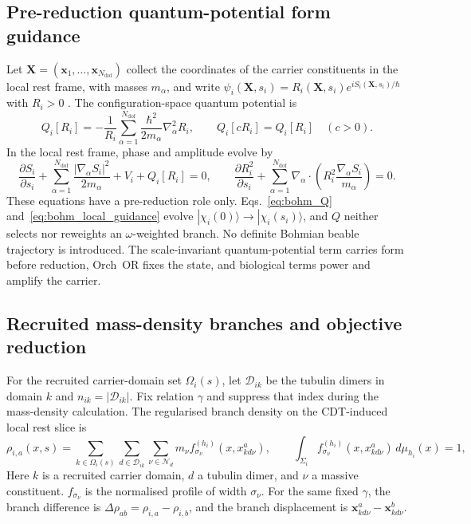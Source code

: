 \subsection{Pre-reduction quantum-potential form guidance}

Let $\mathbf X=(\mathbf x_1,\ldots,\mathbf x_{N_{\mathrm{dof}}})$ collect the coordinates of the
carrier constituents in the local rest frame, with masses $m_\alpha$, and write
$\psi_i(\mathbf X,s_i)=R_i(\mathbf X,s_i)e^{iS_i(\mathbf X,s_i)/\hbar}$ with $R_i>0$
\citep{bohm1952a}. The configuration-space quantum potential is
\begin{equation}
  Q_i[R_i]=-\frac{1}{R_i}
    \sum_{\alpha=1}^{N_{\mathrm{dof}}}\frac{\hbar^2}{2m_\alpha}\nabla_\alpha^2R_i,
  \qquad Q_i[cR_i]=Q_i[R_i]\quad(c>0).
  \label{eq:bohm_Q}
\end{equation}
In the local rest frame, phase and amplitude evolve by
\begin{equation}
  \frac{\partial S_i}{\partial s_i}
  +\sum_{\alpha=1}^{N_{\mathrm{dof}}}\frac{|\nabla_\alpha S_i|^2}{2m_\alpha}
  +V_i+Q_i[R_i]=0,
  \qquad
  \frac{\partial R_i^2}{\partial s_i}
  +\sum_{\alpha=1}^{N_{\mathrm{dof}}}\nabla_\alpha\!\cdot\!\left(
    R_i^2\frac{\nabla_\alpha S_i}{m_\alpha}\right)=0.
  \label{eq:bohm_local_guidance}
\end{equation}
\noindent These equations have a pre-reduction role only. Eqs.~\eqref{eq:bohm_Q}
and~\eqref{eq:bohm_local_guidance} evolve
$|\chi_i(0)\rangle\rightarrow|\chi_i(s_i)\rangle$, and $Q$ neither selects nor
reweights an $\omega$-weighted branch. No definite Bohmian beable trajectory is
introduced.
The scale-invariant quantum-potential term carries form before reduction, Orch~OR
fixes the state, and biological terms power and amplify the carrier.

\subsection{Recruited mass-density branches and objective reduction}

For the recruited carrier-domain set $\Omega_i(s)$, let $\mathcal D_{ik}$ be the
tubulin dimers in domain $k$ and $n_{ik}=|\mathcal D_{ik}|$. Fix relation $\gamma$
and suppress that index during the mass-density calculation. The regularised branch
density on the CDT-induced local rest slice is
\begin{equation}
  \rho_{i,a}(x,s)=
  \sum_{k\in\Omega_i(s)}\sum_{d\in\mathcal D_{ik}}
  \sum_{\nu\in\mathcal N_d}
  m_\nu f_{\sigma_\nu}^{(h_i)}(x,x^{a}_{kd\nu}),
  \qquad
  \int_{\Sigma_i}f_{\sigma_\nu}^{(h_i)}(x,x^{a}_{kd\nu})\,d\mu_{h_i}(x)=1,
  \label{eq:branch_density}
\end{equation}
\noindent Here $k$ is a recruited carrier domain, $d$ a tubulin dimer, and $\nu$ a
massive constituent. $f_{\sigma_\nu}$ is the normalised profile of width
$\sigma_\nu$. For the same fixed $\gamma$, the branch difference is
$\Delta\rho_{ab}=\rho_{i,a}-\rho_{i,b}$, and the branch displacement is
$\mathbf x^a_{kd\nu}-\mathbf x^b_{kd\nu}$.

